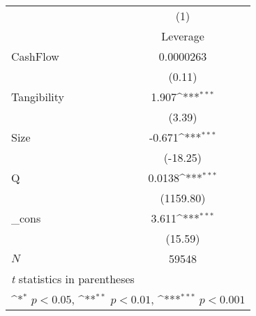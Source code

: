 {
\def\sym#1{\ifmmode^{#1}\else\(^{#1}\)\fi}
\begin{tabular}{l*{1}{c}}
\hline\hline
            &\multicolumn{1}{c}{(1)}\\
            &\multicolumn{1}{c}{Leverage}\\
\hline
CashFlow    &   0.0000263         \\
            &      (0.11)         \\
[1em]
Tangibility &       1.907\sym{***}\\
            &      (3.39)         \\
[1em]
Size        &      -0.671\sym{***}\\
            &    (-18.25)         \\
[1em]
Q           &      0.0138\sym{***}\\
            &   (1159.80)         \\
[1em]
\_cons      &       3.611\sym{***}\\
            &     (15.59)         \\
\hline
\(N\)       &       59548         \\
\hline\hline
\multicolumn{2}{l}{\footnotesize \textit{t} statistics in parentheses}\\
\multicolumn{2}{l}{\footnotesize \sym{*} \(p<0.05\), \sym{**} \(p<0.01\), \sym{***} \(p<0.001\)}\\
\end{tabular}
}
